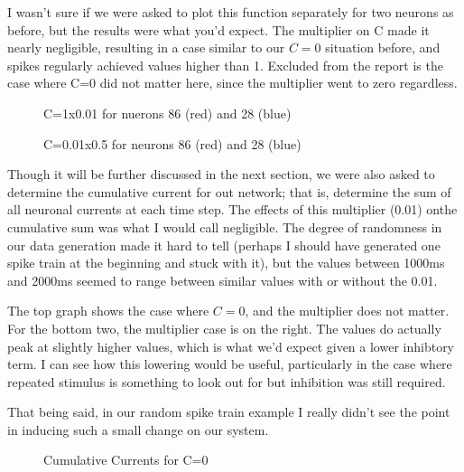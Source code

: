 \documentclass[a4paper,12pt]{article}
\begin{document}
I wasn't sure if we were asked to plot this function separately for two neurons as before, but the results were what you'd expect. The multiplier on C made it nearly negligible, resulting in a case similar to our $C=0$ situation before, and spikes regularly achieved values higher than 1. Excluded from the report is the case where C=0 did not matter here, since the multiplier went to zero regardless.
\begin{center}
\begin{figure}[h!]
\caption{\label{pict1}C=1x0.01 for nuerons 86 (red) and 28 (blue)}
\end{figure}

\begin{figure}[h!]
\caption{\label{pict1}C=0.01x0.5 for neurons 86 (red) and 28 (blue)}
\end{figure}
\end{center}

\vfil\eject


Though it will be further discussed in the next section, we were also asked to determine the cumulative current for out network; that is, determine the sum of all neuronal currents at each time step. The effects of this multiplier (0.01) onthe cumulative sum was what I would call negligible. The degree of randomness in our data generation made it hard to tell (perhaps I should have generated one spike train at the beginning and stuck with it), but the values between 1000ms and 2000ms seemed to range between similar values with or without the 0.01.  

\vspace{2mm}

The top graph shows the case where $C=0$, and the multiplier does not matter. For the bottom two, the multiplier case is on the right. The values do actually peak at slightly higher values, which is what we'd expect given a lower inhibtory term. I can see how this lowering would be useful, particularly in the case where repeated stimulus is something to look out for but inhibition was still required. 

\vspace{2mm}

That being said, in our random spike train example I really didn't see the point in inducing such a small change on our system. 

\vfil\eject

\begin{figure}[h!]
\caption{\label{pict1}Cumulative Currents for C=0}
\end{figure}
\end{document}
